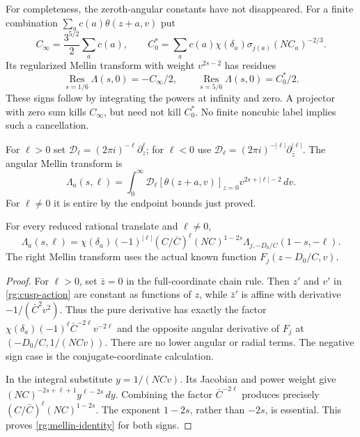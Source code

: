 For completeness, the zeroth-angular constants have not disappeared.
For a finite combination \(\sum_a c(a)\theta(z+a,v)\) put
\begin{equation}\label{rg:endpoint-constants}
 C_\infty=\frac{3^{5/2}}2\sum_a c(a),\qquad
 C_0^*=\sum_a c(a)\chi(\delta_a)\sigma_{j(a)}(NC_a)^{-2/3}.
\end{equation}
Its regularized Mellin transform with weight \(v^{2s-2}\) has residues
\begin{equation}\label{rg:zeroth-residues}
 \operatorname*{Res}_{s=1/6}\Lambda(s,0)=-C_\infty/2,
 \qquad
 \operatorname*{Res}_{s=5/6}\Lambda(s,0)=C_0^*/2 .
\end{equation}
These signs follow by integrating the powers at infinity and zero.
A projector with zero sum kills \(C_\infty\), but need not kill
\(C_0^*\). No finite noncubic label implies such a cancellation.

For \(\ell>0\) set
\(\mathcal D_\ell=(2\pi i)^{-\ell}\partial_z^\ell\);
for \(\ell<0\) use
\(\mathcal D_\ell=(2\pi i)^{-|\ell|}\partial_{\bar z}^{|\ell|}\).
The angular Mellin transform is
\begin{equation}\label{rg:angular-mellin}
 \Lambda_a(s,\ell)=\int_0^\infty
  \mathcal D_\ell[\theta(z+a,v)]_{z=0}
                                v^{2s+|\ell|-2}\,dv .
\end{equation}
For \(\ell\ne0\) it is entire by the endpoint bounds just proved.

\begin{proposition}
\label{rg:angular-identity}
For every reduced rational translate and \(\ell\ne0\),
\begin{equation}\label{rg:mellin-identity}
 \Lambda_a(s,\ell)=
 \chi(\delta_a)(-1)^{|\ell|}(C/\bar C)^\ell(NC)^{1-2s}
                   \Lambda_{j,-D_0/C}(1-s,-\ell).
\end{equation}
The right Mellin transform uses the actual known function
\(F_j(z-D_0/C,v)\).
\end{proposition}
\begin{proof}
For \(\ell>0\), set \(\bar z=0\) in the full-coordinate chain rule.
Then \(z'\) and \(v'\) in \eqref{rg:cusp-action} are constant as
functions of \(z\), while \(\bar z'\) is affine with derivative
\(-1/(\bar C^2v^2)\).
Thus the pure derivative has exactly the factor
\(\chi(\delta_a)(-1)^\ell\bar C^{-2\ell}v^{-2\ell}\)
and the opposite angular derivative of \(F_j\) at
\((-D_0/C,1/(NCv))\).
There are no lower angular or radial terms.
The negative sign case is the conjugate-coordinate calculation.

In the integral substitute \(y=1/(NCv)\).
Its Jacobian and power weight give
\((NC)^{-2s+\ell+1}y^{\ell-2s}\,dy\).
Combining the factor \(\bar C^{-2\ell}\) produces precisely
\((C/\bar C)^\ell(NC)^{1-2s}\).
The exponent \(1-2s\), rather than \(-2s\), is essential.
This proves \eqref{rg:mellin-identity} for both signs.
\end{proof}

